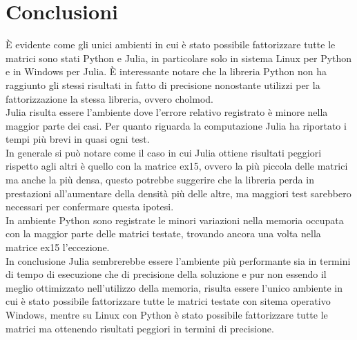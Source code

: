 \documentclass[a4paper, 12pt]{article}
\begin{document}
\section{Conclusioni}
\`E evidente come gli unici ambienti in cui è stato possibile
fattorizzare tutte le matrici sono stati Python e Julia, in particolare solo in
sistema Linux per Python e in Windows per Julia.
\`E interessante notare che la libreria Python non ha raggiunto gli stessi
risultati in fatto di precisione nonostante utilizzi per la fattorizzazione la
stessa libreria, ovvero cholmod.\\
Julia risulta essere l'ambiente dove l'errore relativo registrato è minore nella
maggior parte dei casi.
Per quanto riguarda la computazione Julia ha riportato i tempi più brevi in
quasi ogni test.\\
In generale si può notare come il caso in cui Julia ottiene risultati peggiori
rispetto agli altri è quello con la matrice ex15, ovvero la più piccola delle
matrici ma anche la più densa, questo potrebbe suggerire che la libreria perda
in prestazioni all'aumentare della densità più delle altre, ma maggiori test
sarebbero necessari per confermare questa ipotesi.\\
In ambiente Python sono registrate le minori variazioni nella memoria occupata
con la maggior parte delle matrici testate, trovando ancora una volta nella
matrice ex15 l'eccezione.\\
In conclusione Julia sembrerebbe essere l'ambiente più performante sia in
termini di tempo di esecuzione che di precisione della soluzione e pur non
essendo il meglio ottimizzato nell'utilizzo della memoria, risulta essere
l'unico ambiente in cui è stato possibile fattorizzare tutte le matrici testate
con sitema operativo Windows, mentre su Linux con Python è stato possibile
fattorizzare tutte le matrici ma ottenendo risultati peggiori in termini di
precisione.
\end{document}
